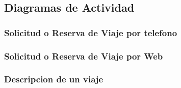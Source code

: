 \subsection{Diagramas de Actividad}

\subsubsection{Solicitud o Reserva de Viaje por telefono}
\subsubsection{Solicitud o Reserva de Viaje por Web}
\label{da:descripcionviaje}
\subsubsection{Descripcion de un viaje}
